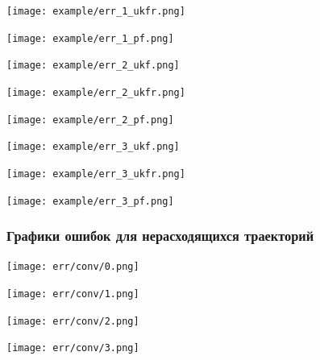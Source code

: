 \documentclass[12pt]{article}
\begin{document}
\begin{landscape}
	\texttt{[image: example/err\_1\_ukfr.png]}\newpage
\end{landscape}

\begin{landscape}
	\texttt{[image: example/err\_1\_pf.png]}\newpage
\end{landscape}

\begin{landscape}
	\texttt{[image: example/err\_2\_ukf.png]}\newpage
\end{landscape}

\begin{landscape}
	\texttt{[image: example/err\_2\_ukfr.png]}\newpage
\end{landscape}

\begin{landscape}
	\texttt{[image: example/err\_2\_pf.png]}\newpage
\end{landscape}

\begin{landscape}
	\texttt{[image: example/err\_3\_ukf.png]}\newpage
\end{landscape}

\begin{landscape}
	\texttt{[image: example/err\_3\_ukfr.png]}\newpage
\end{landscape}

\begin{landscape}
	\texttt{[image: example/err\_3\_pf.png]}\newpage
\end{landscape}

\begin{landscape}
	\subsubsection{Графики ошибок для нерасходящихся траекторий}
	\texttt{[image: err/conv/0.png]}\newpage
\end{landscape}

\begin{landscape}
	\texttt{[image: err/conv/1.png]}\newpage
\end{landscape}

\begin{landscape}
	\texttt{[image: err/conv/2.png]}\newpage
\end{landscape}

\begin{landscape}
	\texttt{[image: err/conv/3.png]}\newpage
\end{landscape}
\end{document}
